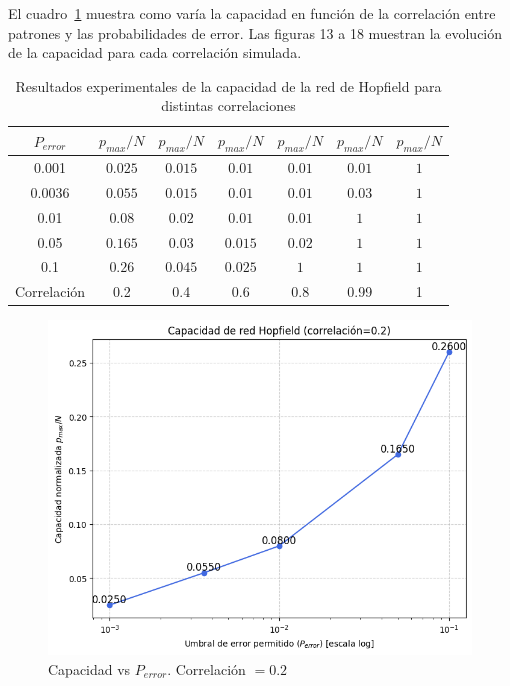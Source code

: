 \documentclass[11pt]{article} %
\begin{document}
El cuadro~\ref{tab:correlaciones} muestra como varía la capacidad en función de la correlación entre patrones y las probabilidades de error. Las figuras 13 a 18 muestran la evolución de la capacidad para cada correlación simulada. 

\begin{table}[h!]
\centering
\begin{tabular}{|c|c|c|c|c|c|c|}
\hline
$P_{error}$ & $p_{max}/N$ & $p_{max}/N$  & $p_{max}/N$ & $p_{max}/N$  &   $p_{max}/N$& $p_{max}/N$ \\ \hline
0.001  &   $0.025$    &    $0.015$   &   $0.01$    &    $0.01$   & $0.01$ &  $1$    \\ \hline
0.0036 &    $0.055$   &     $0.015$  &    $0.01$   &  $0.01$     &  $0.03$ &$1$     \\ \hline
0.01   &    $0.08$  &   $0.02$    &   $0.01$    &   $0.01$    &  $1$  &$1$    \\ \hline
0.05   &    $0.165$   &  $0.03$     &    $0.015$   &   $0.02$    &  $1$ &$1$     \\ \hline
0.1    &   $0.26$   &   $0.045$    &   $0.025$    &   $1$    &  $1$ &$1$     \\ \hline  \hline
Correlación  &0.2  &0.4&0.6&0.8&0.99&1 \\ \hline

\end{tabular}
\caption{Resultados experimentales de la capacidad de la red de Hopfield para distintas correlaciones}
\label{tab:correlaciones}
\end{table}

\begin{figure}[h!]
    \centering
    \includegraphics[width=0.8\linewidth]{imgs/ej2_2_1.png}
    \caption{Capacidad vs $P_{error}$. Correlación $= 0.2$}
    \label{fig:ej2_2_1}
\end{figure}
\end{document}
